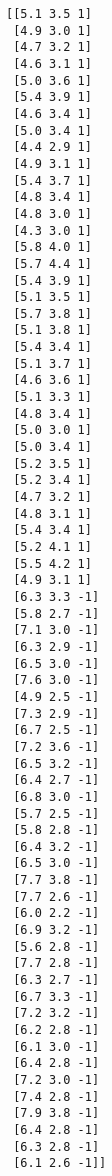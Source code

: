 \documentclass[11pt]{article}
\begin{document}
    \begin{Verbatim}[commandchars=\\\{\}]
[[5.1 3.5 1]
 [4.9 3.0 1]
 [4.7 3.2 1]
 [4.6 3.1 1]
 [5.0 3.6 1]
 [5.4 3.9 1]
 [4.6 3.4 1]
 [5.0 3.4 1]
 [4.4 2.9 1]
 [4.9 3.1 1]
 [5.4 3.7 1]
 [4.8 3.4 1]
 [4.8 3.0 1]
 [4.3 3.0 1]
 [5.8 4.0 1]
 [5.7 4.4 1]
 [5.4 3.9 1]
 [5.1 3.5 1]
 [5.7 3.8 1]
 [5.1 3.8 1]
 [5.4 3.4 1]
 [5.1 3.7 1]
 [4.6 3.6 1]
 [5.1 3.3 1]
 [4.8 3.4 1]
 [5.0 3.0 1]
 [5.0 3.4 1]
 [5.2 3.5 1]
 [5.2 3.4 1]
 [4.7 3.2 1]
 [4.8 3.1 1]
 [5.4 3.4 1]
 [5.2 4.1 1]
 [5.5 4.2 1]
 [4.9 3.1 1]
 [6.3 3.3 -1]
 [5.8 2.7 -1]
 [7.1 3.0 -1]
 [6.3 2.9 -1]
 [6.5 3.0 -1]
 [7.6 3.0 -1]
 [4.9 2.5 -1]
 [7.3 2.9 -1]
 [6.7 2.5 -1]
 [7.2 3.6 -1]
 [6.5 3.2 -1]
 [6.4 2.7 -1]
 [6.8 3.0 -1]
 [5.7 2.5 -1]
 [5.8 2.8 -1]
 [6.4 3.2 -1]
 [6.5 3.0 -1]
 [7.7 3.8 -1]
 [7.7 2.6 -1]
 [6.0 2.2 -1]
 [6.9 3.2 -1]
 [5.6 2.8 -1]
 [7.7 2.8 -1]
 [6.3 2.7 -1]
 [6.7 3.3 -1]
 [7.2 3.2 -1]
 [6.2 2.8 -1]
 [6.1 3.0 -1]
 [6.4 2.8 -1]
 [7.2 3.0 -1]
 [7.4 2.8 -1]
 [7.9 3.8 -1]
 [6.4 2.8 -1]
 [6.3 2.8 -1]
 [6.1 2.6 -1]]

    \end{Verbatim}
\end{document}
